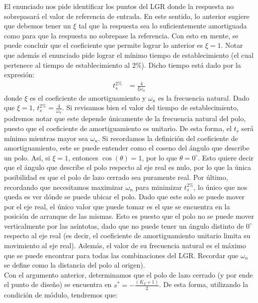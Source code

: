 \documentclass[
  11pt,
  letterpaper,
   addpoints,
   answers
  ]{exam}
\begin{document}
\begin{questions}
\begin{solution}
    El enunciado nos pide identificar los puntos del LGR donde la respuesta no sobrepasará el valor de referencia de entrada. En este sentido, lo anterior sugiere que debemos tener un \( \xi \) tal que la respuesta sea lo suficientemente amortiguada como para que la respuesta no sobrepase la referencia. Con esto en mente, se puede concluir que el coeficiente que permite lograr lo anterior es \( \xi = 1 \). Notar que además el enunciado pide lograr el mínimo tiempo de establecimiento (el cual pertenece al tiempo de establecimiento al \( 2\% \)). Dicho tiempo está dado por la expresión:
    \begin{align}
        t_s ^{2\%} &= \frac{4}{\xi \omega_n} \label{eq7}
    \end{align}
    donde \( \xi \) es el coeficiente de amortiguamiento y \( \omega_n \) es la frecuencia natural. Dado que \( \xi = 1 \), \( t_s ^{2\%} = \frac{4}{\omega_n} \). Si revisamos bien el valor del tiempo de establecimiento, podremos notar que este depende únicamente de la frecuencia natural del polo, puesto que el coeficiente de amortiguamiento es unitario. De esta forma, el \( t_s \) será mínimo mientras mayor sea \( \omega_n \). Si recordamos la definición del coeficiente de amortiguamiento, este se puede entender como el coseno del ángulo que describe un polo. Así, si \( \xi = 1 \), entonces \( \cos(\theta) = 1 \), por lo que \( \theta = 0^{\circ} \). Esto quiere decir que el ángulo que describe el polo respecto al eje real es nulo, por lo que la única posibilidad es que el polo de lazo cerrado sea puramente real.
    Por último, recordando que necesitamos maximizar \( \omega_n \) para minimizar \( t_s ^{2\%} \), lo único que nos queda es ver dónde se puede ubicar el polo. Dado que este solo se puede mover por el eje real, el único valor que puede tomar es el que se encuentra en la posición de arranque de las mismas. Esto es puesto que el polo no se puede mover verticalmente por las asíntotas, dado que no puede tener un ángulo distinto de \( 0^{\circ} \) respecto al eje real (es decir, el coeficiente de amortiguamiento unitario limita su movimiento al eje real). Además, el valor de su frecuencia natural es el máximo que se puede encontrar para todas las combinaciones del LGR. Recordar que \( \omega_n \) se define como la distancia del polo al origen).\\

Con el argumento anterior, determinamos que el polo de lazo cerrado (y por ende el punto de diseño) se encuentra en \( s^{*}=-\frac{(K_T+1)}{2} \). De esta forma, utilizando la condición de módulo, tendremos que:


\end{solution}
\end{questions}
\end{document}
